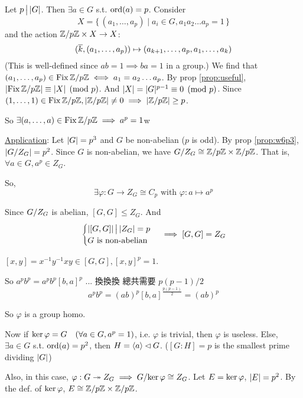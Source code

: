 \begin{theorem}
  Let $p \Div \abs{G}$. Then $\exists a \in G$ s.t. $\ord(a) = p$. Consider
  \[ X = \{\, (a_1, \dots, a_p) \mid a_i \in G, a_1a_2\dots a_p = 1\,\} \]
  and the action $\quot{\Zb}{p\Zb} \times X \to X$:
  \[
    (\ob{k}, (a_1, \dots, a_p)) \mapsto (a_{k+1}, \dots, a_p, a_1, \dots, a_k)
  \]
  (This is well-defined since $ab = 1 \implies ba = 1$ in a group.)
  We find that $(a_1, \dots, a_p) \in \Fix \quot{\Zb}{p\Zb} \iff a_1 = a_2
  \dots a_p$.
  By prop \ref{prop:useful}, $\abs*{\Fix \quot{\Zb}{p\Zb}} \equiv \abs{X}
  \pmod p$. And $\abs{X} = \abs{G}^{p-1} \equiv 0 \pmod p$.
  Since $(1, \dots, 1) \in \Fix \quot{\Zb}{p\Zb}, \abs*{\quot{\Zb}{p\Zb}} \ne 0
  \implies \abs*{\quot{\Zb}{p\Zb}} \ge p$.

  So $\exists (a, \dots, a) \in \Fix \quot{\Zb}{p\Zb} \implies a^p = 1$w
\end{theorem}

\underline{Application}: Let $\abs{G} = p^3$ and $G$ be non-abelian
($p$ is odd).
By prop \ref{prop:w6p3}, $\abs*{\quot{G}{Z_G}} = p^2$. Since $G$ is non-abelian,
we have $\quot{G}{Z_G} \cong \quot{\Zb}{p\Zb} \times \quot{\Zb}{p\Zb}$.
That is, $\forall a \in G, a^p \in Z_G$.

So,
\[
  \exists \varphi: G \to Z_G \cong C_p \text{~with~}
  \varphi: a \mapsto a^p
\]

Since $\quot{G}{Z_G}$ is abelian, $[G,G] \le Z_G$. And
\[
  \begin{cases}
    \abs{[G,G]} \Div \abs{Z_G} = p \\
    G \text{~is non-abelian}
  \end{cases}
  \implies [G,G] = Z_G
\]

\begin{definition}
  $[x, y] = x^{-1}y^{-1}xy \in [G,G], [x,y]^p = 1$.
\end{definition}

So $a^p b^p = a^p b^p [b, a]^p$ ... 換換換 總共需要 $p(p-1)/2$
\[ a^p b^p = (ab)^p [b,a]^{\frac{p(p-1)}{2}} = (ab)^p \]

So $\varphi$ is a group homo.

Now if $\Ker \varphi = G \quad (\forall a \in G, a^p = 1)$,
i.e. $\varphi$ is trivial, then $\varphi$ is useless.
Else, $\exists a \in G$ s.t. $\ord(a) = p^2$, then
$H = \gen{a} \lhd G$. ($[G:H] = p$ is the smallest prime dividing $\abs{G}$)

Also, in this case, $\varphi: G \onto Z_G \implies
\quot{G}{\Ker \varphi} \cong Z_G$. Let $E = \Ker \varphi$, $\abs{E} = p^2$.
By the def. of $\Ker \varphi$, $E \cong \quot{\Zb}{p\Zb} \times
\quot{\Zb}{p\Zb}$.

